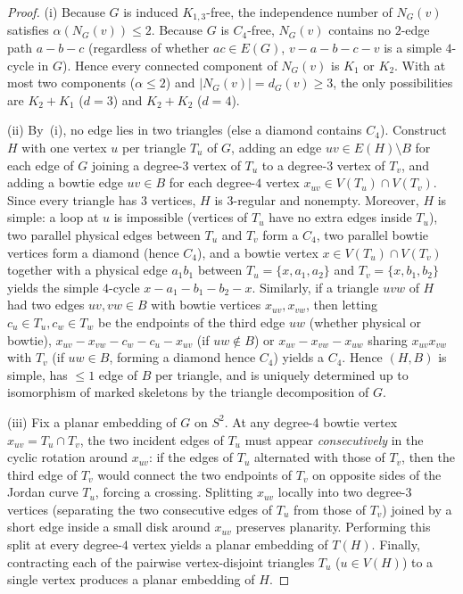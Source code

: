 \documentclass[11pt,reqno]{amsart}
\theoremstyle{plain}
\theoremstyle{definition}
\theoremstyle{remark}
\DeclareRobustCommand{\_}{\ifmmode\text{\textunderscore}\else\textunderscore\allowbreak\fi}
\begin{document}
\begin{proof}
(i) Because $G$ is induced $K_{1,3}$-free, the independence number of $N_G(v)$ satisfies $\alpha(N_G(v)) \le 2$. Because $G$ is $C_4$-free, $N_G(v)$ contains no $2$-edge path $a - b - c$ (regardless of whether $ac \in E(G)$, $v - a - b - c - v$ is a simple $4$-cycle in $G$). Hence every connected component of $N_G(v)$ is $K_1$ or $K_2$. With at most two components ($\alpha \le 2$) and $|N_G(v)| = d_G(v) \ge 3$, the only possibilities are $K_2 + K_1$ ($d = 3$) and $K_2 + K_2$ ($d = 4$).

(ii) By~(i), no edge lies in two triangles (else a diamond contains $C_4$). Construct $H$ with one vertex $u$ per triangle $T_u$ of $G$, adding an edge $uv \in E(H) \setminus B$ for each edge of $G$ joining a degree-$3$ vertex of $T_u$ to a degree-$3$ vertex of $T_v$, and adding a bowtie edge $uv \in B$ for each degree-$4$ vertex $x_{uv} \in V(T_u) \cap V(T_v)$. Since every triangle has $3$ vertices, $H$ is $3$-regular and nonempty. Moreover, $H$ is simple: a loop at $u$ is impossible (vertices of $T_u$ have no extra edges inside $T_u$), two parallel physical edges between $T_u$ and $T_v$ form a $C_4$, two parallel bowtie vertices form a diamond (hence $C_4$), and a bowtie vertex $x \in V(T_u) \cap V(T_v)$ together with a physical edge $a_1 b_1$ between $T_u = \{x, a_1, a_2\}$ and $T_v = \{x, b_1, b_2\}$ yields the simple $4$-cycle $x - a_1 - b_1 - b_2 - x$. Similarly, if a triangle $uvw$ of $H$ had two edges $uv, vw \in B$ with bowtie vertices $x_{uv}, x_{vw}$, then letting $c_u \in T_u, c_w \in T_w$ be the endpoints of the third edge $uw$ (whether physical or bowtie), $x_{uv} - x_{vw} - c_w - c_u - x_{uv}$ (if $uw \notin B$) or $x_{uv} - x_{vw} - x_{uw}$ sharing $x_{uv} x_{vw}$ with $T_v$ (if $uw \in B$, forming a diamond hence $C_4$) yields a $C_4$. Hence $(H, B)$ is simple, has $\le 1$ edge of $B$ per triangle, and is uniquely determined up to isomorphism of marked skeletons by the triangle decomposition of $G$.

(iii) Fix a planar embedding of $G$ on $S^2$. At any degree-$4$ bowtie vertex $x_{uv} = T_u \cap T_v$, the two incident edges of $T_u$ must appear \emph{consecutively} in the cyclic rotation around $x_{uv}$: if the edges of $T_u$ alternated with those of $T_v$, then the third edge of $T_v$ would connect the two endpoints of $T_v$ on opposite sides of the Jordan curve $T_u$, forcing a crossing. Splitting $x_{uv}$ locally into two degree-$3$ vertices (separating the two consecutive edges of $T_u$ from those of $T_v$) joined by a short edge inside a small disk around $x_{uv}$ preserves planarity. Performing this split at every degree-$4$ vertex yields a planar embedding of $T(H)$. Finally, contracting each of the pairwise vertex-disjoint triangles $T_u$ ($u \in V(H)$) to a single vertex produces a planar embedding of $H$.
\end{proof}
\end{document}
